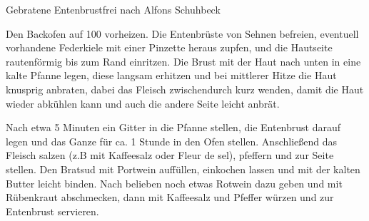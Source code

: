 \begin{recipe}{Gebratene Entenbrust}{frei nach Alfons Schuhbeck}
  \label{Gebratene Entenbrust}
  \inglist

  \steps
  Den Backofen auf 100 \celsius vorheizen. Die Entenbrüste von Sehnen befreien, eventuell
  vorhandene Federkiele mit einer Pinzette heraus zupfen, und die Hautseite rautenförmig
  bis zum Rand einritzen. Die Brust mit der Haut nach unten in eine kalte Pfanne legen,
  diese langsam erhitzen und bei mittlerer Hitze die Haut knusprig anbraten, dabei das
  Fleisch zwischendurch kurz wenden, damit die Haut wieder abkühlen kann und auch die
  andere Seite leicht anbrät.

  Nach etwa 5 Minuten ein Gitter in die Pfanne stellen, die Entenbrust darauf legen und
  das Ganze für ca. 1 Stunde in den Ofen stellen. Anschließend das Fleisch salzen (z.B mit
  Kaffeesalz oder Fleur de sel), pfeffern und zur Seite stellen. Den Bratsud mit Portwein
  auffüllen, einkochen lassen und mit der kalten Butter leicht binden. Nach belieben noch
  etwas Rotwein dazu geben und mit Rübenkraut abschmecken, dann mit Kaffeesalz und Pfeffer
  würzen und zur Entenbrust servieren.
\end{recipe}
